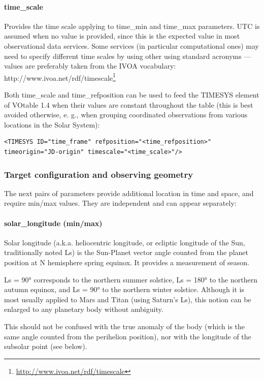\documentclass[11pt,a4paper]{ivoa}
\begin{document}
\paragraph{time\_scale}

Provides the time scale applying to time\_min and time\_max parameters. UTC is assumed when no value is provided, since this is the expected value in most observational data services. Some services (in particular computational ones) may need to specify different time scales by using other using standard acronyms — values are preferably taken from the IVOA vocabulary: http://www.ivoa.net/rdf/timescale\footnote{\url{http://www.ivoa.net/rdf/timescale}}

Both time\_scale and time\_refposition can be used to feed the TIMESYS element of VOtable 1.4 when their values are constant throughout the table (this is best avoided otherwise, e. g., when grouping coordinated observations from various locations in the Solar System):

\begin{verbatim}
<TIMESYS ID="time_frame" refposition="<time_refposition>" timeorigin="JD-origin" timescale="<time_scale>"/>
\end{verbatim}

\subsubsection{Target configuration and observing geometry}

The next pairs of parameters provide additional location in time and space, and require min/max values. They are independent and can appear separately:

\paragraph{solar\_longitude (min/max)}

Solar longitude (a.k.a. heliocentric longitude, or ecliptic longitude of the Sun, traditionally noted Ls) is the Sun-Planet vector angle counted from the planet position at N hemisphere spring equinox. It provides a measurement of season.

Ls = 90° corresponds to the northern summer solstice, Ls = 180° to the northern autumn equinox, and Ls = 90° to the northern winter solstice. Although it is most usually applied to Mars and Titan (using Saturn's Ls), this notion can be enlarged to any planetary body without ambiguity.

This should not be confused with the true anomaly of the body (which is the same angle counted from the perihelion position), nor with the longitude of the subsolar point (see below).
\end{document}
